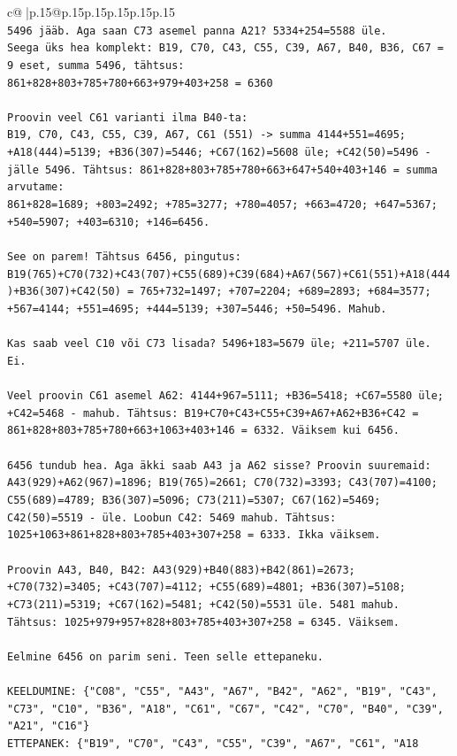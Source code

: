 \documentclass{article}
\begin{document}
{\begin{supertabular}{c@{$\;$}|p{.15\linewidth}@{}p{.15\linewidth}p{.15\linewidth}p{.15\linewidth}p{.15\linewidth}p{.15\linewidth}}
{{{\\ 
\texttt{5496 jääb. Aga saan C73 asemel panna A21? 5334+254=5588 üle.} \\
\texttt{Seega üks hea komplekt: B19, C70, C43, C55, C39, A67, B40, B36, C67 = 9 eset, summa 5496, tähtsus:} \\
\texttt{861+828+803+785+780+663+979+403+258 = 6360} \\
\\ 
\texttt{Proovin veel C61 varianti ilma B40{-}ta:} \\
\texttt{B19, C70, C43, C55, C39, A67, C61 (551) {-}> summa 4144+551=4695; +A18(444)=5139; +B36(307)=5446; +C67(162)=5608 üle; +C42(50)=5496 {-} jälle 5496. Tähtsus: 861+828+803+785+780+663+647+540+403+146 = summa arvutame:} \\
\texttt{861+828=1689; +803=2492; +785=3277; +780=4057; +663=4720; +647=5367; +540=5907; +403=6310; +146=6456.} \\
\\ 
\texttt{See on parem! Tähtsus 6456, pingutus: B19(765)+C70(732)+C43(707)+C55(689)+C39(684)+A67(567)+C61(551)+A18(444)+B36(307)+C42(50) = 765+732=1497; +707=2204; +689=2893; +684=3577; +567=4144; +551=4695; +444=5139; +307=5446; +50=5496. Mahub.} \\
\\ 
\texttt{Kas saab veel C10 või C73 lisada? 5496+183=5679 üle; +211=5707 üle. Ei.} \\
\\ 
\texttt{Veel proovin C61 asemel A62: 4144+967=5111; +B36=5418; +C67=5580 üle; +C42=5468 {-} mahub. Tähtsus: B19+C70+C43+C55+C39+A67+A62+B36+C42 = 861+828+803+785+780+663+1063+403+146 = 6332. Väiksem kui 6456.} \\
\\ 
\texttt{6456 tundub hea. Aga äkki saab A43 ja A62 sisse? Proovin suuremaid:} \\
\texttt{A43(929)+A62(967)=1896; B19(765)=2661; C70(732)=3393; C43(707)=4100; C55(689)=4789; B36(307)=5096; C73(211)=5307; C67(162)=5469; C42(50)=5519 {-} üle. Loobun C42: 5469 mahub. Tähtsus: 1025+1063+861+828+803+785+403+307+258 = 6333. Ikka väiksem.} \\
\\ 
\texttt{Proovin A43, B40, B42: A43(929)+B40(883)+B42(861)=2673; +C70(732)=3405; +C43(707)=4112; +C55(689)=4801; +B36(307)=5108; +C73(211)=5319; +C67(162)=5481; +C42(50)=5531 üle. 5481 mahub. Tähtsus: 1025+979+957+828+803+785+403+307+258 = 6345. Väiksem.} \\
\\ 
\texttt{Eelmine 6456 on parim seni. Teen selle ettepaneku.} \\
\\ 
\texttt{KEELDUMINE: \{"C08", "C55", "A43", "A67", "B42", "A62", "B19", "C43", "C73", "C10", "B36", "A18", "C61", "C67", "C42", "C70", "B40", "C39", "A21", "C16"\}} \\
\texttt{ETTEPANEK: \{"B19", "C70", "C43", "C55", "C39", "A67", "C61", "A18} \\
            }
        }
    }
     \\ \\


\end{supertabular}}
\end{document}
